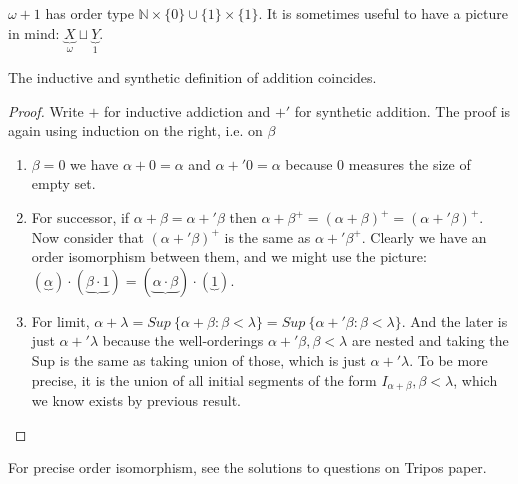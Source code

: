 \begin{example}
$\omega + 1$ has order type $\mathbb{N} \times \{0\} \cup \{1\} \times \{1\}$.
It is sometimes useful to have a picture in mind: $\underbrace{X}_\omega \sqcup \underbrace{Y}_{1}$.
\end{example}
\begin{proposition} The inductive and synthetic definition of addition coincides.
\end{proposition}
\begin{proof} Write $+$ for inductive addiction and $+'$ for synthetic addition.
The proof is again using induction on the right, i.e. on $\beta$
\begin{enumerate}
\item $\beta = 0$ we have $\alpha + 0 = \alpha$ and $\alpha +' 0 = \alpha$
because $0$ measures the size of empty set.\\
\item For successor, if $\alpha + \beta = \alpha +' \beta$ then $\alpha + \beta^+ = (\alpha + \beta)^+ = (\alpha +' \beta)^+$. Now consider that $(\alpha +' \beta)^+$
    is the same as $\alpha +' \beta^+$. Clearly we have an order isomorphism
    between them, and we might use the picture:\\
$(\underbrace{\alpha}) \cdot (\underbrace{\beta \cdot 1}) = (\underbrace{\alpha \cdot \beta}) \cdot (\underbrace{1})$.\\
\item For limit, $\alpha + \lambda = Sup~\{\alpha + \beta: \beta < \lambda\} = Sup~\{\alpha +' \beta: \beta < \lambda\}$. And the later is just $\alpha +' \lambda$
    because the well-orderings $\alpha +' \beta, \beta < \lambda$
    are nested and taking the Sup is the same as taking union of those,
    which is just $\alpha +' \lambda$. To be more precise,
    it is the union of all initial segments of the form $I_{\alpha + \beta}, \beta < \lambda$,
    which we know exists by previous result.
\end{enumerate}
\end{proof}
For precise order isomorphism, see the solutions to questions on Tripos paper.\\
